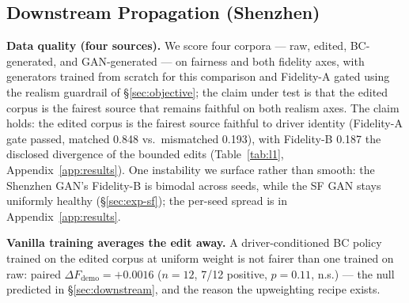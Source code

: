 \subsection{Downstream Propagation (Shenzhen)}\label{sec:exp-downstream}

\textbf{Data quality (four sources).} We score four corpora --- raw, edited,
BC-generated, and GAN-generated --- on fairness and both fidelity axes, with
generators trained from scratch for this comparison and Fidelity-A gated using 
the realism guardrail of \S\ref{sec:objective}; the claim under test is
that the edited corpus is the fairest source that remains faithful on both
realism axes. The claim holds: the edited corpus is the fairest source
faithful to driver identity (Fidelity-A gate passed, matched 0.848 vs.\ mismatched
0.193), with Fidelity-B 0.187 the disclosed divergence of the bounded edits
(Table~\ref{tab:l1}, Appendix~\ref{app:results}). One instability we surface
rather than smooth: the Shenzhen GAN's Fidelity-B is bimodal across seeds, 
while the SF GAN stays uniformly healthy (\S\ref{sec:exp-sf}); the
per-seed spread is in Appendix~\ref{app:results}.

\textbf{Vanilla training averages the edit away.} A driver-conditioned BC
policy trained on the edited corpus at uniform weight is not fairer than one
trained on raw: paired $\Delta F_{\mathrm{demo}} = +0.0016$ ($n = 12$,
7/12 positive, $p = 0.11$, n.s.) --- the null predicted in 
\S\ref{sec:downstream}, and the reason the upweighting recipe exists.

